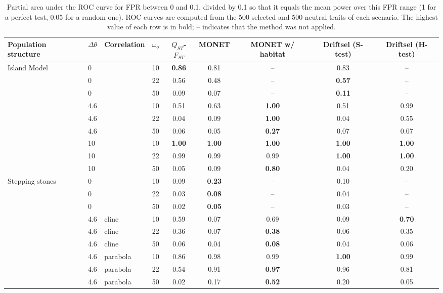\begin{table}[ht]
\centering
\caption{Partial area under the ROC curve for FPR between 0 and 0.1, divided by 0.1 so that it equals the mean power over this FPR range (1 for a perfect test, 0.05 for a random one). ROC curves are computed from the 500 selected and 500 neutral traits of each scenario. The highest value of each row is in bold; -- indicates that the method was not applied.}
\label{tab:pauc_fpr01}
\begin{tabular}{lllrccccc}
\toprule
Population structure & $\Delta\theta$ & Correlation & $\omega_o$ & $Q_{ST}$-$F_{ST}$ & MONET & MONET w/ habitat & Driftsel (S-test) & Driftsel (H-test) \\
\midrule
Island Model & 0 &  & 10 & \textbf{0.86} & 0.81 & -- & 0.83 & -- \\
 & 0 &  & 22 & 0.56 & 0.48 & -- & \textbf{0.57} & -- \\
 & 0 &  & 50 & 0.09 & 0.07 & -- & \textbf{0.11} & -- \\
 & 4.6 &  & 10 & 0.51 & 0.63 & \textbf{1.00} & 0.51 & 0.99 \\
 & 4.6 &  & 22 & 0.04 & 0.09 & \textbf{1.00} & 0.04 & 0.55 \\
 & 4.6 &  & 50 & 0.06 & 0.05 & \textbf{0.27} & 0.07 & 0.07 \\
 & 10 &  & 10 & \textbf{1.00} & \textbf{1.00} & \textbf{1.00} & \textbf{1.00} & \textbf{1.00} \\
 & 10 &  & 22 & 0.99 & 0.99 & 0.99 & \textbf{1.00} & \textbf{1.00} \\
 & 10 &  & 50 & 0.05 & 0.09 & \textbf{0.80} & 0.04 & 0.20 \\
\midrule
Stepping stones & 0 &  & 10 & 0.09 & \textbf{0.23} & -- & 0.10 & -- \\
 & 0 &  & 22 & 0.03 & \textbf{0.08} & -- & 0.04 & -- \\
 & 0 &  & 50 & 0.02 & \textbf{0.05} & -- & 0.03 & -- \\
 & 4.6 & cline & 10 & 0.59 & 0.07 & 0.69 & 0.09 & \textbf{0.70} \\
 & 4.6 & cline & 22 & 0.36 & 0.07 & \textbf{0.38} & 0.06 & 0.35 \\
 & 4.6 & cline & 50 & 0.06 & 0.04 & \textbf{0.08} & 0.04 & 0.06 \\
 & 4.6 & parabola & 10 & 0.86 & 0.98 & 0.99 & \textbf{1.00} & 0.99 \\
 & 4.6 & parabola & 22 & 0.54 & 0.91 & \textbf{0.97} & 0.96 & 0.81 \\
 & 4.6 & parabola & 50 & 0.02 & 0.17 & \textbf{0.52} & 0.20 & 0.05 \\

\end{tabular}
\end{table}
